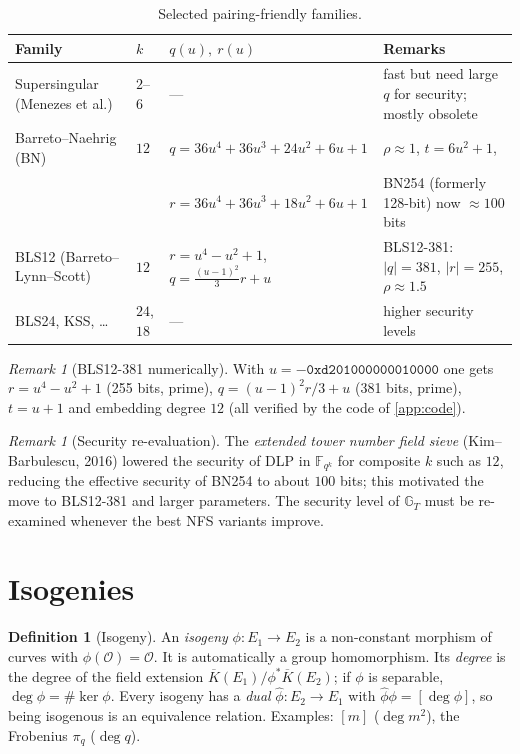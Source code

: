 \documentclass[11pt,a4paper,oneside]{book}
\theoremstyle{plain}
\theoremstyle{definition}
\newtheorem{definition}[theorem]{Definition}
\theoremstyle{remark}
\newtheorem{remark}[theorem]{Remark}
\newcommand{\F}{\mathbb{F}}
\newcommand{\Oinf}{\mathcal{O}}
\newcommand{\Kbar}{\overline{K}}
\begin{document}
\begin{table}[ht]
\centering\footnotesize\setlength{\tabcolsep}{3pt}
\caption{Selected pairing-friendly families.}
\begin{tabular}{@{}p{3.2cm}lp{4.8cm}p{4.6cm}@{}}
\toprule
Family & $k$ & $q(u),\ r(u)$ & Remarks\\
\midrule
Supersingular (Menezes et al.) & $2$--$6$ & --- & fast but need large $q$ for security; mostly obsolete\\
Barreto--Naehrig (BN) & $12$ & $q=36u^4+36u^3+24u^2+6u+1$ & $\rho\approx1$, $t=6u^2+1$,\\
& & $r=36u^4+36u^3+18u^2+6u+1$ & BN254 (formerly 128-bit) now $\approx100$ bits\\
BLS12 (Barreto--Lynn--Scott) & $12$ & $r=u^4-u^2+1$, $q=\tfrac{(u-1)^2}3r+u$ & BLS12-381: $|q|=381$, $|r|=255$, $\rho\approx1.5$\\
BLS24, KSS, \dots & $24$, $18$ & --- & higher security levels\\
\bottomrule
\end{tabular}
\end{table}

\begin{remark}[BLS12-381 numerically]
With $u=-\texttt{0xd201000000010000}$ one gets $r=u^4-u^2+1$ (255 bits, prime), $q=(u-1)^2r/3+u$ (381 bits, prime), $t=u+1$ and embedding degree $12$ (all verified by the code of \cref{app:code}). 
\end{remark}

\begin{remark}[Security re-evaluation]
The \emph{extended tower number field sieve} (Kim--Barbulescu, 2016) lowered the security of DLP in $\F_{q^k}$ for composite $k$ such as $12$, reducing the effective security of BN254 to about $100$ bits; this motivated the move to BLS12-381 and larger parameters. The security level of $\mathbb G_T$ must be re-examined whenever the best NFS variants improve.
\end{remark}

\section{Isogenies}

\begin{definition}[Isogeny]
An \emph{isogeny} $\phi:E_1\to E_2$ is a non-constant morphism of curves with $\phi(\Oinf)=\Oinf$. It is automatically a group homomorphism. Its \emph{degree} is the degree of the field extension $\Kbar(E_1)/\phi^*\Kbar(E_2)$; if $\phi$ is separable, $\deg\phi=\#\ker\phi$. Every isogeny has a \emph{dual} $\hat\phi:E_2\to E_1$ with $\hat\phi\phi=[\deg\phi]$, so being isogenous is an equivalence relation. Examples: $[m]$ ($\deg m^2$), the Frobenius $\pi_q$ ($\deg q$).
\end{definition}
\end{document}
